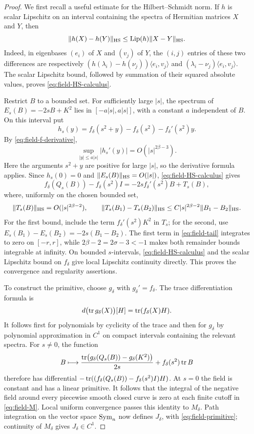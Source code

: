 \begin{proof}
We first recall a useful estimate for the Hilbert--Schmidt norm.
If $h$ is scalar Lipschitz on an interval containing the spectra of
Hermitian matrices $X$ and $Y$, then
\begin{equation}\label{eq:field-HS-calculus}
 \|h(X)-h(Y)\|_{\mathrm{HS}}\leq\operatorname{Lip}(h)\|X-Y\|_{\mathrm{HS}}.
\end{equation}
Indeed, in eigenbases $(e_i)$ of $X$ and $(v_j)$ of $Y$, the
$(i,j)$ entries of these two differences are respectively
$(h(\lambda_i)-h(\nu_j))\langle e_i,v_j\rangle$ and
$(\lambda_i-\nu_j)\langle e_i,v_j\rangle$.  The scalar Lipschitz
bound, followed by summation of their squared absolute values, proves
\eqref{eq:field-HS-calculus}.

Restrict $B$ to a bounded set.  For sufficiently large $|s|$, the
spectrum of $E_s(B)=-2sB+K^2$ lies in $[-a|s|,a|s|]$, with a
constant $a$ independent of $B$.  On this interval put
\[
 h_s(y)=f_\delta(s^2+y)-f_\delta(s^2)-f_\delta'(s^2)y.
\]
By \eqref{eq:field-f-derivative},
\[
 \sup_{|y|\leq a|s|}|h_s'(y)|=O(|s|^{2\beta-3}).
\]
Here the arguments $s^2+y$ are positive for large $|s|$, so the
derivative formula applies.  Since $h_s(0)=0$ and
$\|E_s(B)\|_{\mathrm{HS}}=O(|s|)$, \eqref{eq:field-HS-calculus} gives
\begin{equation}\label{eq:field-tail}
 f_\delta(Q_s(B))-f_\delta(s^2)I
 =-2s f_\delta'(s^2)B+T_s(B),
\end{equation}
where, uniformly on the chosen bounded set,
\[
 \|T_s(B)\|_{\mathrm{HS}}=O(|s|^{2\beta-2}),\qquad
 \|T_s(B_1)-T_s(B_2)\|_{\mathrm{HS}}
 \leq C|s|^{2\beta-2}\|B_1-B_2\|_{\mathrm{HS}}.
\]
For the first bound, include the term $f_\delta'(s^2)K^2$ in
$T_s$; for the second, use
$E_s(B_1)-E_s(B_2)=-2s(B_1-B_2)$.
The first term in \eqref{eq:field-tail} integrates to zero on
$[-r,r]$, while $2\beta-2=2\sigma-3<-1$ makes both remainder
bounds integrable at infinity.  On bounded $s$-intervals,
\eqref{eq:field-HS-calculus} and the scalar Lipschitz bound on
$f_\delta$ give local Lipschitz continuity directly.  This proves
the convergence and regularity assertions.

To construct the primitive, choose $g_\delta$ with
$g_\delta'=f_\delta$.  The trace differentiation formula is
\[
 d\bigl(\operatorname{tr} g_\delta(X)\bigr)[H]
       =\operatorname{tr}(f_\delta(X)H).
\]
It follows first for polynomials by cyclicity of the trace and then
for $g_\delta$ by polynomial approximation in $C^1$ on compact
intervals containing the relevant spectra.  For $s\ne0$, the function
\[
 B\longmapsto
 \frac{\operatorname{tr}\bigl(g_\delta(Q_s(B))-g_\delta(K^2)\bigr)}{2s}
      +f_\delta(s^2)\operatorname{tr} B
\]
therefore has differential
$-\operatorname{tr}((f_\delta(Q_s(B))-f_\delta(s^2)I)H)$.
At $s=0$ the field is constant and has a linear primitive.
It follows that the integral of the negative field around every
piecewise smooth closed curve is zero at each finite cutoff in
\eqref{eq:field-M}.  Local uniform convergence passes this identity
to $M_\delta$.  Path integration on the vector space $\operatorname{Sym}_n$ now
defines $J_\delta$, with \eqref{eq:field-primitive}; continuity of
$M_\delta$ gives $J_\delta\in C^1$.
\end{proof}

